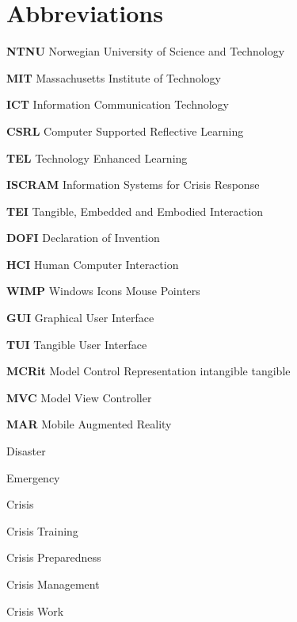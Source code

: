 \chapter{Abbreviations}\label{abbreviations}

\textbf{NTNU} Norwegian University of Science and Technology

\textbf{MIT} Massachusetts Institute of Technology

\textbf{ICT} Information Communication Technology

\textbf{CSRL} Computer Supported Reflective Learning

\textbf{TEL} Technology Enhanced Learning

\textbf{ISCRAM} Information Systems for Crisis Response

\textbf{TEI} Tangible, Embedded and Embodied Interaction

\textbf{DOFI} Declaration of Invention

\textbf{HCI} Human Computer Interaction

\textbf{WIMP} Windows Icons Mouse Pointers

\textbf{GUI} Graphical User Interface

\textbf{TUI} Tangible User Interface

\textbf{MCRit} Model Control Representation intangible tangible

\textbf{MVC} Model View Controller

\textbf{MAR} Mobile Augmented Reality

Disaster

Emergency

Crisis

Crisis Training

Crisis Preparedness

Crisis Management

Crisis Work
